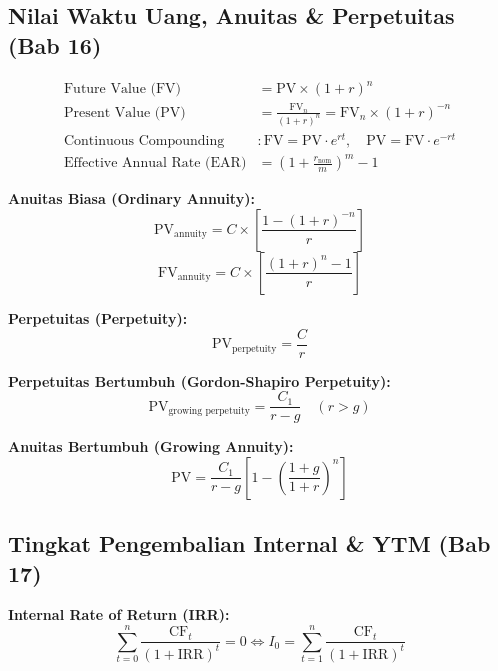 \documentclass[10pt,a4paper]{article}
\begin{document}
\subsection{Nilai Waktu Uang, Anuitas \& Perpetuitas (Bab 16)}

\begin{align}
\text{Future Value (FV)} &= \text{PV} \times (1 + r)^n \\
\text{Present Value (PV)} &= \frac{\text{FV}_n}{(1 + r)^n} = \text{FV}_n \times (1 + r)^{-n} \\
\text{Continuous Compounding} &: \text{FV} = \text{PV} \cdot e^{rt}, \quad \text{PV} = \text{FV} \cdot e^{-rt} \\
\text{Effective Annual Rate (EAR)} &= \left(1 + \frac{r_{\text{nom}}}{m}\right)^m - 1
\end{align}

\textbf{Anuitas Biasa (Ordinary Annuity):}
\begin{equation}
\text{PV}_{\text{annuity}} = C \times \left[\frac{1 - (1 + r)^{-n}}{r}\right]
\end{equation}
\begin{equation}
\text{FV}_{\text{annuity}} = C \times \left[\frac{(1 + r)^n - 1}{r}\right]
\end{equation}

\textbf{Perpetuitas (Perpetuity):}
\begin{equation}
\text{PV}_{\text{perpetuity}} = \frac{C}{r}
\end{equation}

\textbf{Perpetuitas Bertumbuh (Gordon-Shapiro Perpetuity):}
\begin{equation}
\text{PV}_{\text{growing perpetuity}} = \frac{C_1}{r - g} \quad (r > g)
\end{equation}

\textbf{Anuitas Bertumbuh (Growing Annuity):}
\begin{equation}
\text{PV} = \frac{C_1}{r - g} \left[1 - \left(\frac{1 + g}{1 + r}\right)^n\right]
\end{equation}

\subsection{Tingkat Pengembalian Internal \& YTM (Bab 17)}

\textbf{Internal Rate of Return (IRR):}
\begin{equation}
\sum_{t=0}^n \frac{\text{CF}_t}{(1 + \text{IRR})^t} = 0 \iff I_0 = \sum_{t=1}^n \frac{\text{CF}_t}{(1 + \text{IRR})^t}
\end{equation}
\end{document}
